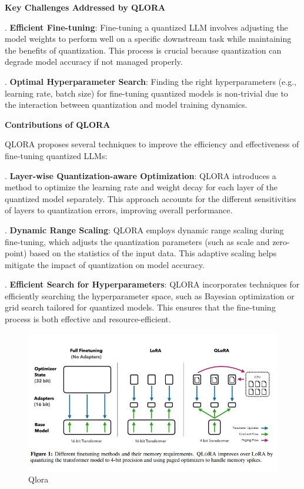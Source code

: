 \hfill \break
\textbf{Key Challenges Addressed by QLORA}

\hfill {}. \textbf{Efficient Fine-tuning}: Fine-tuning a quantized LLM involves adjusting the model weights to perform well on a specific downstream task while maintaining the benefits of quantization. This process is crucial because quantization can degrade model accuracy if not managed properly.

\hfill {}. \textbf{Optimal Hyperparameter Search}: Finding the right hyperparameters (e.g., learning rate, batch size) for fine-tuning quantized models is non-trivial due to the interaction between quantization and model training dynamics.

\hfill \break
\textbf{Contributions of QLORA}

QLORA proposes several techniques to improve the efficiency and effectiveness of fine-tuning quantized LLMs:


\hfill {}. \textbf{Layer-wise Quantization-aware Optimization}: QLORA introduces a method to optimize the learning rate and weight decay for each layer of the quantized model separately. This approach accounts for the different sensitivities of layers to quantization errors, improving overall performance.


\hfill {}. \textbf{Dynamic Range Scaling}: QLORA employs dynamic range scaling during fine-tuning, which adjusts the quantization parameters (such as scale and zero-point) based on the statistics of the input data. This adaptive scaling helps mitigate the impact of quantization on model accuracy.


\hfill {}. \textbf{Efficient Search for Hyperparameters}: QLORA incorporates techniques for efficiently searching the hyperparameter space, such as Bayesian optimization or grid search tailored for quantized models. This ensures that the fine-tuning process is both effective and resource-efficient.

\begin{figure}[h!]
	\centering
	\includegraphics[scale=0.5]{figures/Qlora.jpeg}
	\caption{ Qlora }
\end{figure}
\newpage
